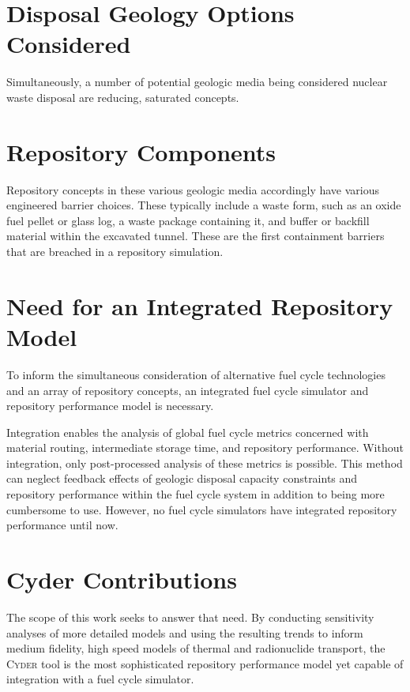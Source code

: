 \documentclass[letterpaper]{article}
\newcommand{\Cyder}{\textsc{Cyder}\xspace}
\begin{document}
\section{Disposal Geology Options Considered}

Simultaneously, a number of potential geologic media being considered nuclear 
waste disposal are reducing, saturated concepts.

\section{Repository Components}

Repository concepts in these various geologic media accordingly have various 
engineered barrier choices. These typically include a waste form, such as an 
oxide fuel pellet or glass log, a waste package containing it, and buffer or 
backfill material within the excavated tunnel. These are the first containment 
barriers that are breached in a repository simulation.

\section{Need for an Integrated Repository Model}

To inform the simultaneous consideration of alternative fuel cycle technologies 
and an array of repository concepts, an integrated fuel cycle simulator and 
repository performance model is necessary.

Integration enables the analysis of global fuel cycle metrics concerned with 
material routing, intermediate storage time, and repository performance.  
Without integration, only post-processed analysis of these metrics is possible. 
This method can neglect feedback effects of geologic disposal capacity 
constraints and repository performance within the fuel cycle system in addition 
to being more cumbersome to use. However, no fuel cycle simulators have 
integrated repository performance until now. 

\section{Cyder Contributions}

The scope of this work seeks to answer that need. By conducting sensitivity 
analyses of more detailed models and using the resulting trends to inform  
medium fidelity, high speed models of thermal and radionuclide transport, the 
\Cyder tool is the most sophisticated repository performance model yet capable 
of integration with a fuel cycle simulator.
\end{document}
